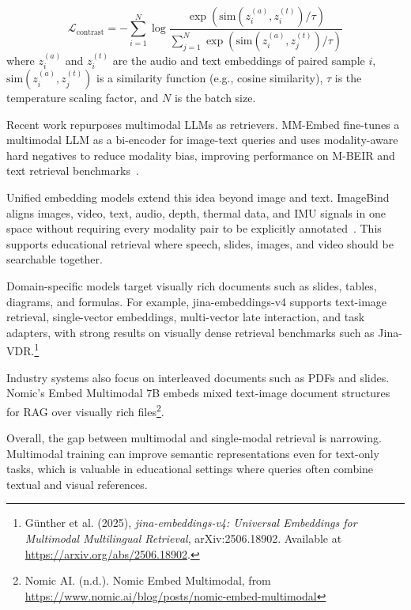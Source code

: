 \begin{equation*}
    \mathcal{L}_{\text{contrast}} = -\sum_{i=1}^{N} \log
    \dfrac{\exp(\mathrm{sim}(z_i^{(a)}, z_i^{(t)}) / \tau)}
    {\sum_{j=1}^{N} \exp(\mathrm{sim}(z_i^{(a)}, z_j^{(t)}) / \tau)}
\end{equation*}
where $z_i^{(a)}$ and $z_i^{(t)}$ are the audio and text embeddings of paired sample $i$, $\mathrm{sim}(z_i^{(a)}, z_j^{(t)})$ is a similarity function (e.g., cosine similarity), $\tau$ is the temperature scaling factor, and $N$ is the batch size.


Recent work repurposes multimodal LLMs as retrievers. MM-Embed fine-tunes a multimodal LLM as a bi-encoder for image-text queries and uses modality-aware hard negatives to reduce modality bias, improving performance on M-BEIR and text retrieval benchmarks~\cite{lin2024mmembed}.

Unified embedding models extend this idea beyond image and text. ImageBind aligns images, video, text, audio, depth, thermal data, and IMU signals in one space without requiring every modality pair to be explicitly annotated~\cite{girdhar2023imagebind}. This supports educational retrieval where speech, slides, images, and video should be searchable together.

Domain-specific models target visually rich documents such as slides, tables, diagrams, and formulas. For example, jina-embeddings-v4 supports text-image retrieval, single-vector embeddings, multi-vector late interaction, and task adapters, with strong results on visually dense retrieval benchmarks such as Jina-VDR.\footnote{Günther et al. (2025), \emph{jina-embeddings-v4: Universal Embeddings for Multimodal Multilingual Retrieval}, arXiv:2506.18902. Available at \url{https://arxiv.org/abs/2506.18902}.}

Industry systems also focus on interleaved documents such as PDFs and slides. Nomic's Embed Multimodal 7B embeds mixed text-image document structures for RAG over visually rich files\footnote{Nomic AI. (n.d.). Nomic Embed Multimodal, from \url{https://www.nomic.ai/blog/posts/nomic-embed-multimodal}}.

Overall, the gap between multimodal and single-modal retrieval is narrowing. Multimodal training can improve semantic representations even for text-only tasks, which is valuable in educational settings where queries often combine textual and visual references.


